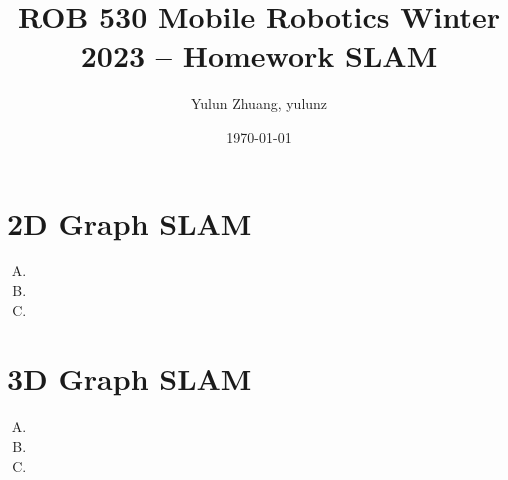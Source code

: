 \documentclass[11pt, oneside, letter]{article}
\begin{document}
\title{\huge\textbf{ROB 530 Mobile Robotics Winter 2023 -- Homework SLAM}}
\author{Yulun Zhuang, yulunz}
\date{\today}
\maketitle


\section{2D Graph SLAM}
\begin{enumerate}[A.]
\item 

\item 

\item 

    
\end{enumerate}


\section{3D Graph SLAM}

\begin{enumerate}[A.]

\item 

\item 

\item 

\end{enumerate}
\end{document}
